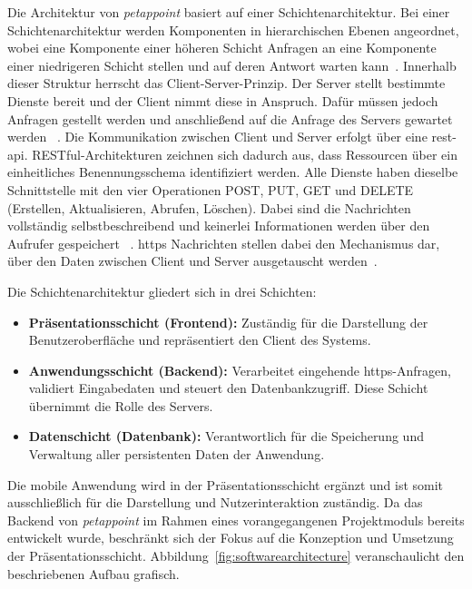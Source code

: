 Die Architektur von \textit{petappoint} basiert auf einer Schichtenarchitektur. Bei einer Schichtenarchitektur werden Komponenten in hierarchischen Ebenen angeordnet, wobei eine Komponente einer höheren Schicht Anfragen an eine Komponente einer niedrigeren Schicht stellen und auf deren Antwort warten kann~\cite[S.~57]{tanenbaum2007}. Innerhalb dieser Struktur herrscht das Client-Server-Prinzip. Der Server stellt bestimmte Dienste bereit und der Client nimmt diese in Anspruch. Dafür müssen jedoch Anfragen gestellt werden und anschließend auf die Anfrage des Servers gewartet werden ~\cite[S.~79]{tanenbaum2007}. Die Kommunikation zwischen Client und Server erfolgt über eine \gls{rest}-\gls{api}. RESTful-Architekturen zeichnen sich dadurch aus, dass Ressourcen über ein einheitliches 
Benennungsschema identifiziert werden. Alle Dienste haben dieselbe Schnittstelle mit den vier Operationen POST, PUT, GET und DELETE (Erstellen, Aktualisieren, Abrufen, Löschen). Dabei sind die Nachrichten vollständig selbstbeschreibend und keinerlei Informationen werden über den Aufrufer gespeichert ~\cite[S.~66]{tanenbaum2007}.  \gls{https} Nachrichten stellen dabei den Mechanismus dar, über den Daten zwischen Client und Server ausgetauscht werden~\cite{mdn-http-messages}. 

Die Schichtenarchitektur gliedert sich in drei Schichten: 
\begin{itemize}
    \item \textbf{Präsentationsschicht (Frontend):} Zuständig für die Darstellung 
    der Benutzeroberfläche und repräsentiert den Client des Systems.
    \item \textbf{Anwendungsschicht (Backend):} Verarbeitet eingehende 
    \gls{https}-Anfragen, validiert Eingabedaten und steuert den Datenbankzugriff. 
    Diese Schicht übernimmt die Rolle des Servers.
    \item \textbf{Datenschicht (Datenbank):} Verantwortlich für die Speicherung 
    und Verwaltung aller persistenten Daten der Anwendung.
\end{itemize}

Die mobile Anwendung wird in der Präsentationsschicht ergänzt und ist somit ausschließlich für die Darstellung und Nutzerinteraktion zuständig. Da das 
Backend von \textit{petappoint} im Rahmen eines vorangegangenen Projektmoduls bereits entwickelt wurde, beschränkt sich der Fokus auf die Konzeption und Umsetzung der Präsentationsschicht. Abbildung~\ref{fig:softwarearchitecture} veranschaulicht den beschriebenen Aufbau grafisch.


